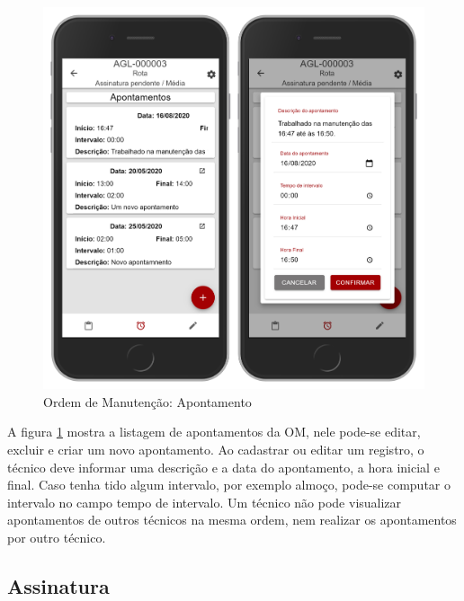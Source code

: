 \begin{figure}[H]
	\caption{\label{mobile-om-apontamento}Ordem de Manutenção: Apontamento}
	\begin{center}
		\includegraphics[scale=0.55]{./Figuras/agil.it/mobile-om-apontamento.jpg}
	\end{center}
\end{figure}

A figura \ref{mobile-om-apontamento} mostra a listagem de apontamentos da OM, nele pode-se editar, excluir e criar um novo apontamento. Ao cadastrar ou editar um registro, o técnico deve informar uma descrição e a data do apontamento, a hora inicial e final. Caso tenha tido algum intervalo, por exemplo almoço, pode-se computar o intervalo no campo tempo de intervalo. Um técnico não pode visualizar apontamentos de outros técnicos na mesma ordem, nem realizar os apontamentos por outro técnico.

\subsection{Assinatura}

